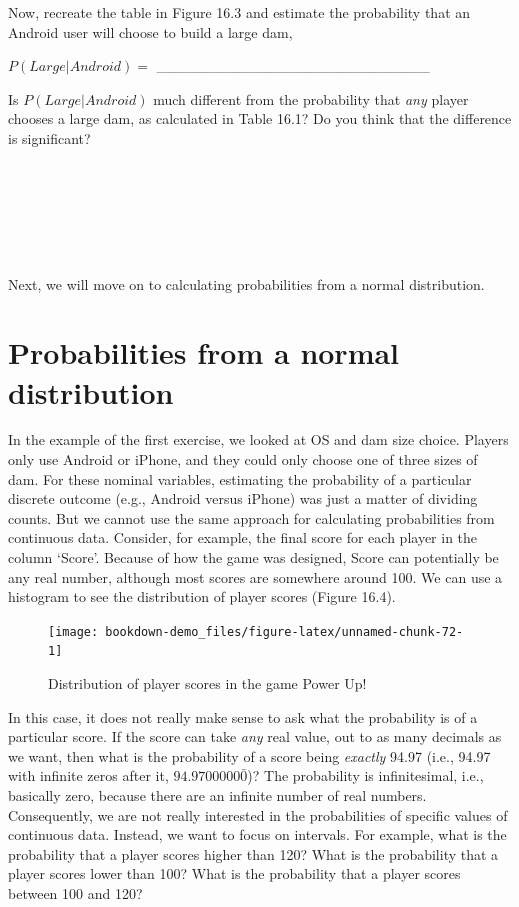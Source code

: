 \documentclass[
]{scrbook}
\begin{document}
Now, recreate the table in Figure 16.3 and estimate the probability that an Android user will choose to build a large dam,

\(P(Large | Android) =\) \_\_\_\_\_\_\_\_\_\_\_\_\_\_\_\_\_\_\_\_\_\_\_\_\_\_

Is \(P(Large | Android)\) much different from the probability that \emph{any} player chooses a large dam, as calculated in Table 16.1? Do you think that the difference is significant?

\begin{verbatim}






\end{verbatim}

Next, we will move on to calculating probabilities from a normal distribution.

\hypertarget{probabilities-from-a-normal-distribution}{%
\section{Probabilities from a normal distribution}\label{probabilities-from-a-normal-distribution}}

In the example of the first exercise, we looked at OS and dam size choice.
Players only use Android or iPhone, and they could only choose one of three sizes of dam.
For these nominal variables, estimating the probability of a particular discrete outcome (e.g., Android versus iPhone) was just a matter of dividing counts.
But we cannot use the same approach for calculating probabilities from continuous data.
Consider, for example, the final score for each player in the column `Score'.
Because of how the game was designed, Score can potentially be any real number, although most scores are somewhere around 100.
We can use a histogram to see the distribution of player scores (Figure 16.4).

\begin{figure}
\texttt{[image: bookdown-demo\_files/figure-latex/unnamed-chunk-72-1]} \caption{Distribution of player scores in the game Power Up!}\label{fig:unnamed-chunk-72}
\end{figure}

In this case, it does not really make sense to ask what the probability is of a particular score.
If the score can take \emph{any} real value, out to as many decimals as we want, then what is the probability of a score being \emph{exactly} 94.97 (i.e., 94.97 with infinite zeros after it, \(94.9700000\bar{0}\))?
The probability is infinitesimal, i.e., basically zero, because there are an infinite number of real numbers.
Consequently, we are not really interested in the probabilities of specific values of continuous data.
Instead, we want to focus on intervals.
For example, what is the probability that a player scores higher than 120?
What is the probability that a player scores lower than 100?
What is the probability that a player scores between 100 and 120?
\end{document}
